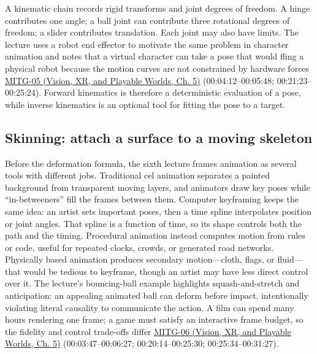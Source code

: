 A kinematic chain records rigid transforms and joint degrees of freedom. A hinge contributes one angle; a ball joint can contribute three rotational degrees of freedom; a slider contributes translation. Each joint may also have limits. The lecture uses a robot end effector to motivate the same problem in character animation and notes that a virtual character can take a pose that would fling a physical robot because the motion curves are not constrained by hardware forces \href{../07-Vision-XR-and-Playable-Worlds/main.pdf\#nameddest=04-visual-computing-ii-ch036-mitg-05---hierarchical-modeling}{MITG-05 (Vision, XR, and Playable Worlds, Ch. 5)} (00:04:12--00:05:48; 00:21:23--00:25:24). Forward kinematics is therefore a deterministic evaluation of a pose, while inverse kinematics is an optional tool for fitting the pose to a target.

\subsection{Skinning: attach a surface to a moving skeleton}\label{04-visual-computing-ii-ch029-skinning-attach-a-surface-to-a-moving-skeleton}

Before the deformation formula, the sixth lecture frames animation as several tools with different jobs. Traditional cel animation separates a painted background from transparent moving layers, and animators draw key poses while ``in-betweeners'' fill the frames between them. Computer keyframing keeps the same idea: an artist sets important poses, then a time spline interpolates position or joint angles. That spline is a function of time, so its shape controls both the path and the timing. Procedural animation instead computes motion from rules or code, useful for repeated clocks, crowds, or generated road networks. Physically based animation produces secondary motion---cloth, flags, or fluid---that would be tedious to keyframe, though an artist may have less direct control over it. The lecture's bouncing-ball example highlights squash-and-stretch and anticipation: an appealing animated ball can deform before impact, intentionally violating literal causality to communicate the action. A film can spend many hours rendering one frame; a game must satisfy an interactive frame budget, so the fidelity and control trade-offs differ \href{../07-Vision-XR-and-Playable-Worlds/main.pdf\#nameddest=04-visual-computing-ii-ch036-mitg-06---animation-skinningenveloping}{MITG-06 (Vision, XR, and Playable Worlds, Ch. 5)} (00:03:47--00:06:27; 00:20:14--00:25:30; 00:25:34--00:31:27).

